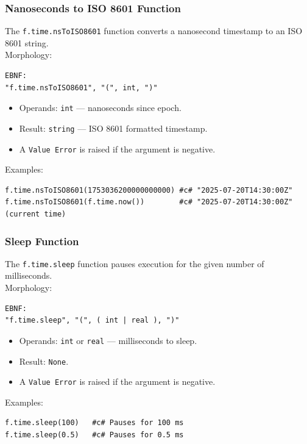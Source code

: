 \subsubsection{Nanoseconds to ISO 8601 Function}
The \texttt{f.time.nsToISO8601} function converts a nanosecond timestamp to an ISO 8601 string. \\
Morphology:
\begin{verbatim}
EBNF:
"f.time.nsToISO8601", "(", int, ")"
\end{verbatim}
\begin{itemize}
\item Operands: \texttt{int} --- nanoseconds since epoch.
\item Result: \texttt{string} --- ISO 8601 formatted timestamp.
\item A \texttt{Value Error} is raised if the argument is negative.
\end{itemize}
Examples:
\begin{verbatim}
f.time.nsToISO8601(1753036200000000000) #c# "2025-07-20T14:30:00Z"
f.time.nsToISO8601(f.time.now())        #c# "2025-07-20T14:30:00Z" (current time)
\end{verbatim}

\subsubsection{Sleep Function}
The \texttt{f.time.sleep} function pauses execution for the given number of milliseconds. \\
Morphology:
\begin{verbatim}
EBNF:
"f.time.sleep", "(", ( int | real ), ")"
\end{verbatim}
\begin{itemize}
\item Operands: \texttt{int} or \texttt{real} --- milliseconds to sleep.
\item Result: \texttt{None}.
\item A \texttt{Value Error} is raised if the argument is negative.
\end{itemize}
Examples:
\begin{verbatim}
f.time.sleep(100)   #c# Pauses for 100 ms
f.time.sleep(0.5)   #c# Pauses for 0.5 ms
\end{verbatim}

